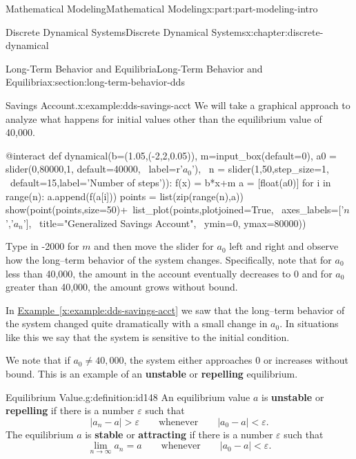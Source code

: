\documentclass[oneside,10pt,]{book}
\newcommand{\xreffont}{\relax}
\newcommand{\terminology}[1]{\textbf{#1}}
\numberwithin{equation}{section}
\newcommand{\lt}{<}
\newcommand{\gt}{>}
\begin{document}
\begin{partptx}{Mathematical Modeling}{}{Mathematical Modeling}{}{}{x:part:part-modeling-intro}
\begin{chapterptx}{Discrete Dynamical Systems}{}{Discrete Dynamical Systems}{}{}{x:chapter:discrete-dynamical}
\begin{sectionptx}{Long-Term Behavior and Equilibria}{}{Long-Term Behavior and Equilibria}{}{}{x:section:long-term-behavior-dds}
\begin{example}{Savings Account.}{x:example:dds-savings-acct}%
We will take a graphical approach to analyze what happens for initial values other than the equilibrium value of \textdollar{}40,000.%
\begin{sageinput}
@interact
def dynamical(b=(1.05,(-2,2,0.05)), m=input_box(default=0), 
              a0 = slider(0,80000,1, default=40000, \
              label=r'\(a_0\)'), \
              n = slider(1,50,step_size=1, \
              default=15,label='Number of steps')):
    f(x) = b*x+m
    a = [float(a0)]
    for i in range(n):
        a.append(f(a[i]))
    points = list(zip(range(n),a))
    show(point(points,size=50)+\
         list_plot(points,plotjoined=True, \
         axes_labels=['$n$','$a_n$'], \
         title="Generalized Savings Account", \
         ymin=0, ymax=80000))
\end{sageinput}
Type in -2000 for \(m\) and then move the slider for \(a_0\) left and right and observe how the long–term behavior of the system changes. Specifically, note that for \(a_0\) less than \textdollar{}40,000, the amount in the account eventually decreases to 0 and for \(a_0\) greater than \textdollar{}40,000, the amount grows without bound.%
\end{example}
In \hyperref[x:example:dds-savings-acct]{Example~{\xreffont\ref{x:example:dds-savings-acct}}} we saw that the long–term behavior of the system changed quite dramatically with a small change in \(a_0\). In situations like this we say that the system is sensitive to the initial condition.%
\par
We note that if \(a_0\ne 40,000\), the system either approaches 0 or increases without bound. This is an example of an \terminology{unstable} or \terminology{repelling} equilibrium.%
\begin{definition}{Equilibrium Value.}{g:definition:id148}%
An equilibrium value \(a\) is \terminology{unstable} or \terminology{repelling} if there is a number \(\varepsilon\) such that%
%
\begin{equation*}
|a_n - a|\gt\varepsilon \qquad \text{whenever} \qquad |a_0 - a|\lt\varepsilon.
\end{equation*}
The equilibrium \(a\) is \terminology{stable} or \terminology{attracting} if there is a number \(\varepsilon\) such that%
%
\begin{equation*}
\lim_{n\to\infty} a_n = a \qquad \text{whenever} \qquad |a_0 - a|
\lt\varepsilon.
\end{equation*}
\end{definition}

\end{sectionptx}
\end{chapterptx}
\end{partptx}
\end{document}
